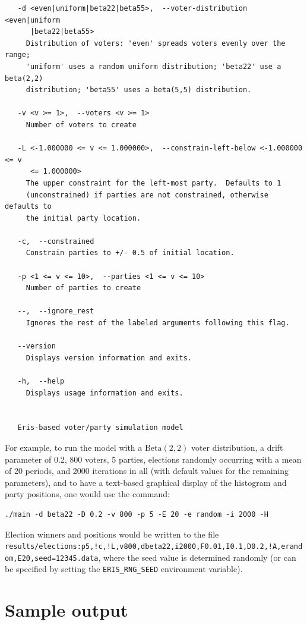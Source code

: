 \documentclass[12pt]{article}
\numberwithin{equation}{subsection}
\begin{document}
{\begin{Verbatim}
   -d <even|uniform|beta22|beta55>,  --voter-distribution <even|uniform
      |beta22|beta55>
     Distribution of voters: 'even' spreads voters evenly over the range;
     'uniform' uses a random uniform distribution; 'beta22' use a beta(2,2)
     distribution; 'beta55' uses a beta(5,5) distribution.

   -v <v >= 1>,  --voters <v >= 1>
     Number of voters to create

   -L <-1.000000 <= v <= 1.000000>,  --constrain-left-below <-1.000000 <= v
      <= 1.000000>
     The upper constraint for the left-most party.  Defaults to 1
     (unconstrained) if parties are not constrained, otherwise defaults to
     the initial party location.

   -c,  --constrained
     Constrain parties to +/- 0.5 of initial location.

   -p <1 <= v <= 10>,  --parties <1 <= v <= 10>
     Number of parties to create

   --,  --ignore_rest
     Ignores the rest of the labeled arguments following this flag.

   --version
     Displays version information and exits.

   -h,  --help
     Displays usage information and exits.


   Eris-based voter/party simulation model
\end{Verbatim}
}

For example, to run the model with a $\textrm{Beta}(2,2)$ voter distribution, a drift parameter of
0.2, 800 voters, 5 parties, elections randomly occurring with a mean of 20 periods, and 2000
iterations in all (with default values for the remaining parameters), and to have a text-based
graphical display of the histogram and party positions, one would use the command:

{\footnotesize\begin{Verbatim}
./main -d beta22 -D 0.2 -v 800 -p 5 -E 20 -e random -i 2000 -H
\end{Verbatim}
}

Election winners and positions would be written to the file
\texttt{results/elections:p5,!c,!L,v800,dbeta22,i2000,F0.01,I0.1,D0.2,!A,erandom,E20,seed=12345.data},
where the seed value is determined randomly (or can be specified by setting the
\texttt{ERIS\_RNG\_SEED} environment variable).


\section{Sample output}\label{app:output}
\end{document}
